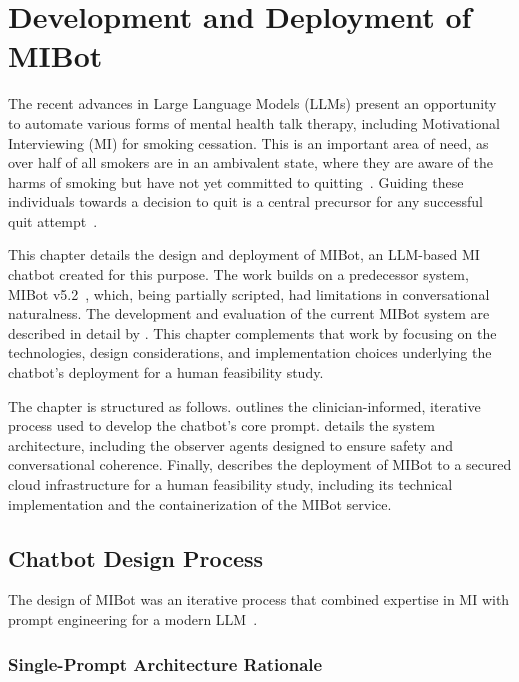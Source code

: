 \chapter{Development and Deployment of MIBot}
\label{ch:mibot}

The recent advances in Large Language Models (LLMs) present an opportunity to automate various forms of mental health talk therapy, including Motivational Interviewing (MI) for smoking cessation. This is an important area of need, as over half of all smokers are in an ambivalent state, where they are aware of the harms of smoking but have not yet committed to quitting~\citep{Babb2017}. Guiding these individuals towards a decision to quit is a central precursor for any successful quit attempt~\citep{West2006}.

This chapter details the design and deployment of MIBot, an LLM-based MI chatbot created for this purpose. The work builds on a predecessor system, MIBot v5.2~\citep{brown2023mi}, which, being partially scripted, had limitations in conversational naturalness. The development and evaluation of the current MIBot system are described in detail by \citet{mahmood-etal-2025-fully}. This chapter complements that work by focusing on the technologies, design considerations, and implementation choices underlying the chatbot's deployment for a human feasibility study.

The chapter is structured as follows.  outlines the clinician-informed, iterative process used to develop the chatbot's core prompt.  details the system architecture, including the observer agents designed to ensure safety and conversational coherence. Finally,  describes the deployment of MIBot to a secured cloud infrastructure for a human feasibility study, including its technical implementation and the containerization of the MIBot service.




\section{Chatbot Design Process}
\label{sec:iterative-development}

The design of MIBot was an iterative process that combined expertise in MI with prompt engineering for a modern LLM~\citep{openai2024gpt4ocard}.

\subsection{Single-Prompt Architecture Rationale}
\label{sec:single-prompt-rationale}

